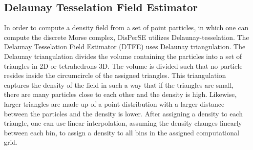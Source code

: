 \subsection{Delaunay Tesselation Field Estimator}
In order to compute a density field from a set of point particles, in which one
can compute the discrete Morse complex, DisPerSE utilizes
Delaunay-tesselation\cite{2000A&A...363L..29S}. The Delaunay Tesselation Field
Estimator (DTFE) uses Delaunay triangulation. The Delaunay triangulation
divides the volume containing the particles into a set of triangles in 2D or
tetrahedrons 3D. The volume is divided such that no particle resides inside the
circumcircle of the assigned triangles. This triangulation captures the density of the field in such a
way that if the triangles are small, there are many particles close to each other
and the density is high. Likewise, larger triangles are made up of a point
distribution with a larger distance between the particles and the density is
lower. After assigning a density to each triangle, one can use linear
interpolation, assuming the density changes linearly between each bin, to assign
a density to all bins in the assigned computational grid.

